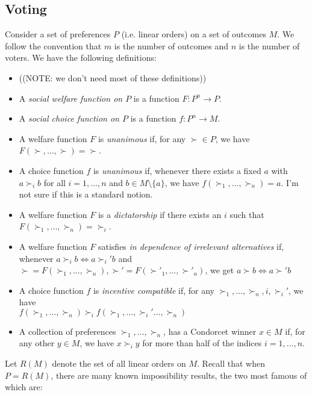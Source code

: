 \documentclass[12pt]{article}
\newcommand{\1}[1]{\mathds{1}[{#1}]}
\begin{document}
  \subsection{Voting}
    Consider a set of preferences $P$ (i.e. linear orders) on a
    set of outcomes $M$.
    We follow the convention that $m$ is the number of outcomes and $n$
    is the number of voters.
    We have the following definitions:
    \begin{itemize}
      \item ((NOTE: we don't need most of these definitions))
      \item A \emph{social welfare function on $P$}
        is a function $F : P^n \to P$.
      \item A \emph{social choice function on $P$} 
        is a function $f : P^n \to M$.
      \item A welfare function $F$ is \emph{unanimous} if,
        for any $\succ \in P$, we have $F(\succ,\ldots,\succ) = \succ$.
      \item A choice function $f$ is \emph{unanimous} if,
        whenever there exists a fixed $a$ with $a \succ_i b$ for all 
        $i=1,\ldots, n$ and $b\in M\setminus \{a\}$,
        we have $f(\succ_1,\ldots,\succ_n) = a$.
        I'm not sure if this is a standard notion.
      \item A welfare function $F$ is a \emph{dictatorship} if
        there exists an $i$ such that $F(\succ_1,\ldots,\succ_n) = \succ_i$.
      \item A welfare function $F$ satisfies \emph{in dependence of
        irrelevant alternatives} if, whenever $a\succ_i b \iff a\succ_i' b$
        and $\succ = F(\succ_1,\ldots,\succ_n),
        \succ' = F(\succ'_1,\ldots,\succ'_n)$,
        we get $a\succ b \iff a\succ' b$
      \item A choice function $f$ is \emph{incentive compatible} if,
        for any $\succ_1,\ldots,\succ_n, i, \succ_i'$, we have \\
        $f(\succ_1,\ldots,\succ_n) \succ_i f(\succ_1,\ldots,\succ_i'\ldots,\succ_n)$
      \item A collection of preferences $\succ_1,\ldots,\succ_n$,
        has a Condorcet winner $x \in M$ if, for any other $y\in M$,
        we have $x \succ_i y$ for more than half of the indices
        $i=1,\ldots,n$.
    \end{itemize}

    Let $R(M)$ denote the set of all linear orders on $M$.
    Recall that when $P = R(M)$, there are many known impossibility results,
    the two most famous of which are:
\end{document}
